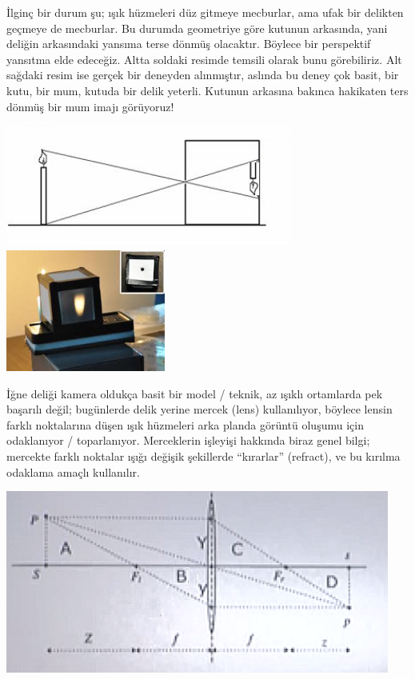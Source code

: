 \documentclass[12pt,fleqn]{article}\usepackage{../../common}
\begin{document}
İlginç bir durum şu; ışık hüzmeleri düz gitmeye mecburlar, ama ufak bir
delikten geçmeye de mecburlar. Bu durumda geometriye göre kutunun
arkasında, yani deliğin arkasındaki yansıma terse dönmüş olacaktır. Böylece
bir perspektif yansıtma elde edeceğiz. Altta soldaki resimde temsili olarak
bunu görebiliriz. Alt sağdaki resim ise gerçek bir deneyden alınmıştır,
aslında bu deney çok basit, bir kutu, bir mum, kutuda bir delik
yeterli. Kutunun arkasına bakınca hakikaten ters dönmüş bir mum imajı
görüyoruz!

\includegraphics[height=4cm]{pinhole5.png}
\includegraphics[height=4cm]{pinhole2.png}

İğne deliği kamera oldukça basit bir model / teknik, az ışıklı ortamlarda pek
başarılı değil; bugünlerde delik yerine mercek (lens) kullanılıyor, böylece
lensin farklı noktalarına düşen ışık hüzmeleri arka planda görüntü oluşumu için
odaklanıyor / toparlanıyor. Merceklerin işleyişi hakkında biraz genel bilgi;
mercekte farklı noktalar ışığı değişik şekillerde ``kırarlar'' (refract), ve bu
kırılma odaklama amaçlı kullanılır.

\includegraphics[height=6cm]{pinhole1.png}
\end{document}
